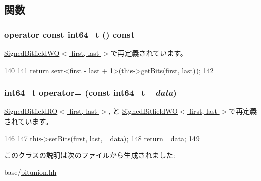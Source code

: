 \subsection{関数}
\hypertarget{classBitfieldBackend_1_1SignedBitfieldTypes_1_1SignedBitfield_a44fb8a8077f66f5a72d1c16acfc80f9c}{
\subsubsection[{operator const int64\_\-t}]{\setlength{\rightskip}{0pt plus 5cm}operator const int64\_\-t () const}}
\label{classBitfieldBackend_1_1SignedBitfieldTypes_1_1SignedBitfield_a44fb8a8077f66f5a72d1c16acfc80f9c}


\hyperlink{classBitfieldBackend_1_1SignedBitfieldTypes_1_1SignedBitfieldWO_a44fb8a8077f66f5a72d1c16acfc80f9c}{SignedBitfieldWO$<$ first, last $>$}で再定義されています。


\begin{DoxyCode}
140             {
141                 return sext<first - last + 1>(this->getBits(first, last));
142             }
\end{DoxyCode}
\hypertarget{classBitfieldBackend_1_1SignedBitfieldTypes_1_1SignedBitfield_aa9c1202c4f5162c5214e708c80d5d4c8}{
\subsubsection[{operator=}]{\setlength{\rightskip}{0pt plus 5cm}int64\_\-t operator= (const int64\_\-t {\em \_\-data})}}
\label{classBitfieldBackend_1_1SignedBitfieldTypes_1_1SignedBitfield_aa9c1202c4f5162c5214e708c80d5d4c8}


\hyperlink{classBitfieldBackend_1_1SignedBitfieldTypes_1_1SignedBitfieldRO_aa9c1202c4f5162c5214e708c80d5d4c8}{SignedBitfieldRO$<$ first, last $>$}, と \hyperlink{classBitfieldBackend_1_1SignedBitfieldTypes_1_1SignedBitfieldWO_aa9c1202c4f5162c5214e708c80d5d4c8}{SignedBitfieldWO$<$ first, last $>$}で再定義されています。


\begin{DoxyCode}
146             {
147                 this->setBits(first, last, _data);
148                 return _data;
149             }
\end{DoxyCode}


このクラスの説明は次のファイルから生成されました:\begin{DoxyCompactItemize}
\item 
base/\hyperlink{bitunion_8hh}{bitunion.hh}\end{DoxyCompactItemize}
